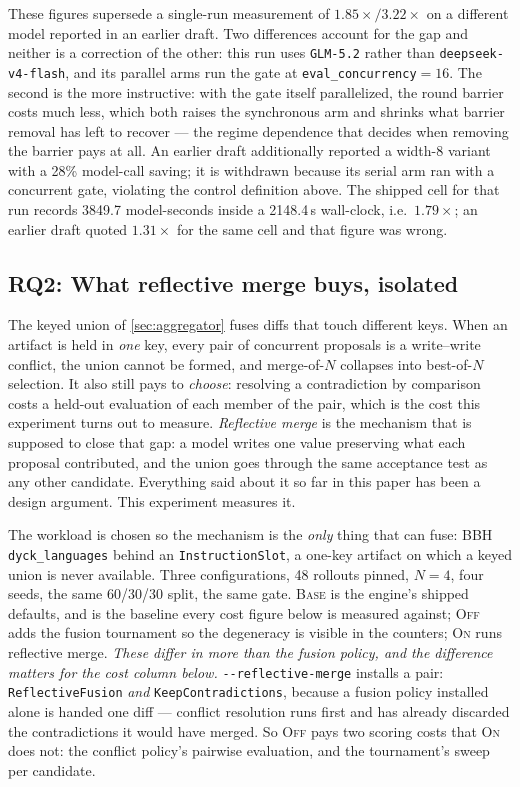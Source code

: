 \documentclass{article}
\newcommand{\code}[1]{\texttt{#1}}
\begin{document}
These figures supersede a single-run measurement of $1.85\times / 3.22\times$ on a different model reported in an earlier draft. Two differences account for the gap and neither is a correction of the other: this run uses \code{GLM-5.2} rather than \code{deepseek-v4-flash}, and its parallel arms run the gate at \code{eval\_concurrency}${=}16$. The second is the more instructive: with the gate itself parallelized, the round barrier costs much less, which both raises the synchronous arm and shrinks what barrier removal has left to recover --- the regime dependence that decides when removing the barrier pays at all. An earlier draft additionally reported a width-8 variant with a 28\% model-call saving; it is withdrawn because its serial arm ran with a concurrent gate, violating the control definition above. The shipped cell for that run records 3849.7 model-seconds inside a 2148.4\,s wall-clock, i.e.\ $1.79\times$; an earlier draft quoted $1.31\times$ for the same cell and that figure was wrong.

\subsection{RQ2: What reflective merge buys, isolated}
\label{sec:exp-reflective}
The keyed union of \cref{sec:aggregator} fuses diffs that touch different keys. When an artifact is held in \emph{one} key, every pair of concurrent proposals is a write--write conflict, the union cannot be formed, and merge-of-$N$ collapses into best-of-$N$ selection. It also still pays to \emph{choose}: resolving a contradiction by comparison costs a held-out evaluation of each member of the pair, which is the cost this experiment turns out to measure. \emph{Reflective merge} is the mechanism that is supposed to close that gap: a model writes one value preserving what each proposal contributed, and the union goes through the same acceptance test as any other candidate. Everything said about it so far in this paper has been a design argument. This experiment measures it.

The workload is chosen so the mechanism is the \emph{only} thing that can fuse: BBH \code{dyck\_languages} \citep{suzgun2023bbh} behind an \code{InstructionSlot}, a one-key artifact on which a keyed union is never available. Three configurations, 48 rollouts pinned, $N{=}4$, four seeds, the same 60/30/30 split, the same gate. \textsc{Base} is the engine's shipped defaults, and is the baseline every cost figure below is measured against; \textsc{Off} adds the fusion tournament so the degeneracy is visible in the counters; \textsc{On} runs reflective merge. \emph{These differ in more than the fusion policy, and the difference matters for the cost column below.} \code{-{}-reflective-merge} installs a pair: \code{ReflectiveFusion} \emph{and} \code{KeepContradictions}, because a fusion policy installed alone is handed one diff --- conflict resolution runs first and has already discarded the contradictions it would have merged. So \textsc{Off} pays two scoring costs that \textsc{On} does not: the conflict policy's pairwise evaluation, and the tournament's sweep per candidate.
\end{document}
